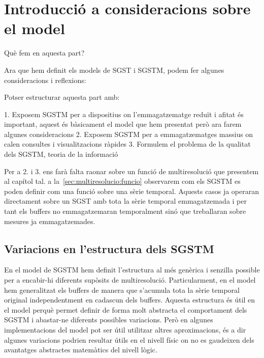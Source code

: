 \chapter{Introducció a consideracions sobre el model}


Què fem en aquesta part?

Ara que hem definit els models de \gls{SGST} i \gls{SGSTM}, podem fer algunes consideracions i reflexions:



Potser estructurar aquesta part amb:

1. Exposem SGSTM per a dispositius on l'emmagatzematge reduït i afitat és important, aquest és bàsicament el model que hem presentat però ara farem algunes consideracions
2. Exposem SGSTM per a emmagatzematges massius on calen consultes i visualitzacions ràpides
3. Formulem el problema de la qualitat dels SGSTM, teoria de la informació



Per a 2. i 3. ens farà falta raonar sobre un funció de multiresolució que presentem al capítol tal.
 a la~\autoref{sec:multiresolucio:funcio} observarem com els \gls{SGSTM} es poden definir com una funció sobre una sèrie temporal. Aquests casos ja operaran directament sobre un \gls{SGST} amb tota la sèrie temporal emmagatzemada i per tant els buffers no emmagatzemaran temporalment sinó que treballaran sobre mesures ja emmagatzemades. 













\section{Variacions en l'estructura dels SGSTM}


En el model de \gls{SGSTM} hem definit l'estructura al més genèrica i
senzilla possible per a encabir-hi diferents supòsits de
multiresolució. 
Particularment, en el model hem generalitzat els buffers de manera que
s'acumula tota la sèrie temporal original independentment en cadascun
dels buffers. Aquesta estructura és útil en el model perquè permet
definir de forma molt abstracta el comportament dels \gls{SGSTM} i
abastar-ne diferents possibles variacions.  Però en algunes
implementacions del model pot ser útil utilitzar altres aproximacions,
és a dir algunes variacions podrien resultar útils en el nivell físic
on no es gaudeixen dels avantatges abstractes matemàtics del nivell
lògic.



